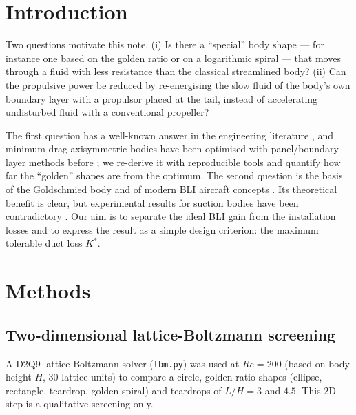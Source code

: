 \documentclass[11pt,a4paper]{article}
\begin{document}
\section{Introduction}
Two questions motivate this note.
(i) Is there a ``special'' body shape --- for instance one based on the golden ratio or on a
logarithmic spiral --- that moves through a fluid with less resistance than the classical
streamlined body?
(ii) Can the propulsive power be reduced by re-energising the slow fluid of the body's own
boundary layer with a propulsor placed at the tail, instead of accelerating undisturbed
fluid with a conventional propeller?

The first question has a well-known answer in the engineering literature
\cite{hoerner1965}, and minimum-drag axisymmetric bodies have been optimised with
panel/boundary-layer methods before \cite{parsons1974,myring1976,lutz1998}; we re-derive it with reproducible tools and quantify how far the
``golden'' shapes are from the optimum. The second question is the basis of the
Goldschmied body \cite{goldschmied1966} and of modern BLI aircraft concepts
\cite{smith1993,drela2009,dellacorte2021}. Its theoretical benefit is clear, but
experimental results for suction bodies have been contradictory \cite{roepke2012}. Our aim is to separate the ideal BLI gain from the installation losses
and to express the result as a simple design criterion: the maximum tolerable duct loss $K^*$.

\section{Methods}
\subsection{Two-dimensional lattice-Boltzmann screening}
A D2Q9 lattice-Boltzmann solver \cite{kruger2017} (\texttt{lbm.py}) was used at $Re=200$ (based on body
height $H$, 30 lattice units) to compare a circle, golden-ratio shapes (ellipse, rectangle,
teardrop, golden spiral) and teardrops of $L/H=3$ and $4.5$. This 2D step is a qualitative
screening only.
\end{document}
